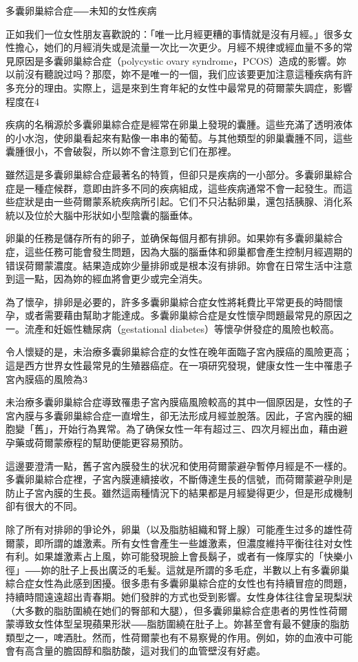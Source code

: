 \documentclass[12pt,UTF8]{ctexbook}
\begin{document}
多囊卵巢綜合症⸺未知的女性疾病




正如我们一位女性朋友喜歡說的：「唯一比月經更糟的事情就是沒有月經。」很多女性擔心，她们的月經消失或是流量一次比一次更少。月經不規律或經血量不多的常見原因是多囊卵巢綜合症（polycystic ovary syndrome，PCOS）造成的影響。妳以前沒有聽說过吗？那麼，妳不是唯一的一個，我们应该要更加注意這種疾病有許多充分的理由。实際上，這是來到生育年紀的女性中最常見的荷爾蒙失調症，影響程度在4%

疾病的名稱源於多囊卵巢綜合症是經常在卵巢上發現的囊腫。這些充滿了透明液体的小水泡，使卵巢看起來有點像一串串的葡萄。与其他類型的卵巢囊腫不同，這些囊腫很小，不會破裂，所以妳不會注意到它们在那裡。

雖然這是多囊卵巢綜合症最著名的特質，但卻只是疾病的一小部分。多囊卵巢綜合症是一種症候群，意即由許多不同的疾病組成，這些疾病通常不會一起發生。而這些症狀是由一些荷爾蒙系統疾病所引起。它们不只沾黏卵巢，還包括胰腺、消化系統以及位於大腦中形狀如小型陰囊的腦垂体。

卵巢的任務是儲存所有的卵子，並确保每個月都有排卵。如果妳有多囊卵巢綜合症，這些任務可能會發生問題，因為大腦的腦垂体和卵巢都會產生控制月經週期的错误荷爾蒙濃度。結果造成妳少量排卵或是根本沒有排卵。妳會在日常生活中注意到這一點，因為妳的經血將會更少或完全消失。

為了懷孕，排卵是必要的，許多多囊卵巢綜合症女性將耗費比平常更長的時間懷孕，或者需要藉由幫助才能達成。多囊卵巢綜合症是女性懷孕問題最常見的原因之一。流產和妊娠性糖尿病（gestational diabetes）等懷孕併發症的風險也較高。

令人懷疑的是，未治療多囊卵巢綜合症的女性在晚年面臨子宮內膜癌的風險更高；這是西方世界女性最常見的生殖器癌症。在一項研究發現，健康女性一生中罹患子宮內膜癌的風險為3%

未治療多囊卵巢綜合症導致罹患子宮內膜癌風險較高的其中一個原因是，女性的子宮內膜与多囊卵巢綜合症一直增生，卻无法形成月經並脫落。因此，子宮內膜的細胞變「舊」，开始行為異常。為了确保女性一年有超过三、四次月經出血，藉由避孕藥或荷爾蒙療程的幫助便能更容易預防。

這邊要澄清一點，舊子宮內膜發生的状况和使用荷爾蒙避孕暫停月經是不一樣的。多囊卵巢綜合症裡，子宮內膜連續接收，不斷傳達生長的信號，而荷爾蒙避孕則是防止子宮內膜的生長。雖然這兩種情況下的結果都是月經變得更少，但是形成機制卻有很大的不同。

除了所有对排卵的爭论外，卵巢（以及脂肪組織和腎上腺）可能產生过多的雄性荷爾蒙，即所謂的雄激素。所有女性會產生一些雄激素，但濃度維持平衡往往对女性有利。如果雄激素占上風，妳可能發現臉上會長鬍子，或者有一條厚实的「快樂小徑」⸺妳的肚子上長出廣泛的毛髪。這就是所謂的多毛症，半數以上有多囊卵巢綜合症女性為此感到困擾。很多患有多囊卵巢綜合症的女性也有持續冒痘的問題，持續時間遠遠超出青春期。她们發胖的方式也受到影響。女性身体往往會呈現梨狀（大多數的脂肪圍繞在她们的臀部和大腿），但多囊卵巢綜合症患者的男性性荷爾蒙導致女性体型呈現蘋果形狀⸺脂肪圍繞在肚子上。妳甚至會有最不健康的脂肪類型之一，啤酒肚。然而，性荷爾蒙也有不易察覺的作用。例如，妳的血液中可能會有高含量的膽固醇和脂肪酸，這对我们的血管壁沒有好處。
\end{document}
